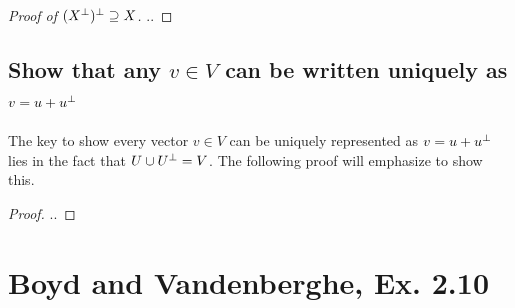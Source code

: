 \documentclass[11pt,a4paper]{article}
\begin{document}
\begin{proof}[Proof of $(X^{\perp})^{\perp} \supseteq X$]
    ..
\end{proof}
\subsection{Show that any $v \in V$ can be written uniquely as $v = u + u^{\perp}$} 
The key to show every vector $v \in V$ can be uniquely represented as $v = u +
u^{\perp}$ lies in the fact that $U \cup U^{\perp} = V$. The following proof will
emphasize to show this.
\begin{proof}
    ..
\end{proof}

\newpage
\section{Boyd and Vandenberghe, Ex. 2.10}
\newcommand{\Snp}{\ensuremath{\mathbb{S}_{+}^{n}}}
\newcommand{\x}[1]{\ensuremath{\mathbf{x}_{#1}}}
\newcommand{\linear}[1]{\ensuremath{b^T #1}}
\newcommand{\quadratic}[1]{\ensuremath{#1^{T} A #1}}
\newcommand{\nsquadratic}[2]{\ensuremath{#1^{T} A #2}}
\newcommand{\quacombo}[1]{\ensuremath{\quadratic{#1} + \linear{#1} + c}}
\newcommand{\xcombo}{\ensuremath{\lambda \x{1} + (1-\lambda) \x{2}}}
\end{document}
